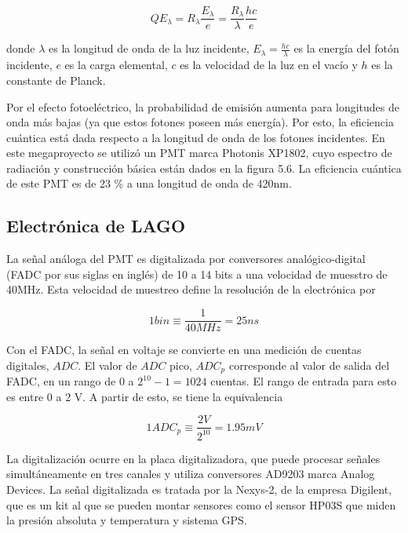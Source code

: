 \documentclass{book}
\begin{document}
\begin{equation}
QE_\lambda=R_\lambda\frac{E_\lambda}{e}=\frac{R_\lambda}{\lambda}\frac{hc}{e}
\end{equation}

donde $\lambda$ es la longitud de onda de la luz incidente, $E_\lambda=\frac{hc}{\lambda}$ es la energ\'ia del fot\'on incidente, $e$ es la carga elemental, $c$ es la velocidad de la luz en el vac\'io y $h$ es la constante de Planck.

Por el efecto fotoel\'ectrico, la probabilidad de emisi\'on aumenta para longitudes de onda m\'as bajas (ya que estos fotones poseen m\'as energ\'ia). Por esto, la eficiencia cu\'antica est\'a dada respecto a la longitud de onda de los fotones incidentes. En este megaproyecto se utiliz\'o un PMT marca Photonis XP1802, cuyo espectro de radiaci\'on y construcci\'on b\'asica est\'an dados en la figura 5.6. La eficiencia cu\'antica de este PMT es de 23 \% a una longitud de onda de 420nm. \citep{Hamamatsu} \citep{Photonis}

\subsection{Electr\'onica de LAGO}
La se\~nal an\'aloga del PMT es digitalizada por conversores anal\'ogico-digital (FADC por sus siglas en ingl\'es) de 10 a 14 bits a una velocidad de muesstro de 40MHz. Esta velocidad de muestreo define la resoluci\'on de la electr\'onica por

\begin{equation}
1 bin\equiv\frac{1}{40MHz}=25ns
\end{equation}

Con el FADC, la se\~nal en voltaje se convierte en una medici\'on de cuentas digitales, $ADC$. El valor de $ADC$ pico, $ADC_p$ corresponde al valor de salida del FADC, en un rango de 0 a $2^10-1=1024$ cuentas. El rango de entrada para esto es entre 0 a 2 V. A partir de esto, se tiene la equivalencia

\begin{equation}
1 ADC_p\equiv\frac{2V}{2^{10}}=1.95mV
\end{equation}

La digitalizaci\'on ocurre en la placa digitalizadora, que puede procesar se\~nales simult\'aneamente en tres canales y utiliza conversores AD9203 marca Analog Devices. La se\~nal digitalizada es tratada por la Nexys-2, de la empresa Digilent, que es un kit al que se pueden montar sensores como el sensor HP03S que miden la presi\'on absoluta y temperatura y sistema GPS. \citep{ARNALDI} \citep{PEREZ}
\end{document}
